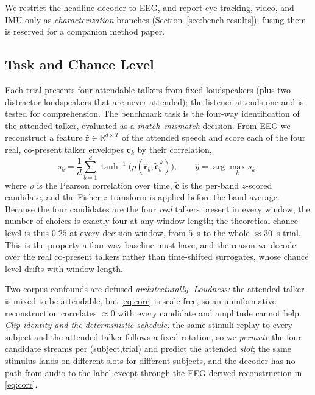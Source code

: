 \documentclass[journal]{IEEEtran}
\newcommand{\chance}{0.25}
\begin{document}
We restrict the headline decoder to EEG, and report eye tracking, video, and IMU
only as \emph{characterization} branches (Section~\ref{sec:bench-results}); fusing
them is reserved for a companion method paper.

\subsection{Task and Chance Level}
\label{sec:bench-task}

Each trial presents four attendable talkers from fixed loudspeakers (plus two
distractor loudspeakers that are never attended); the listener attends one and is
tested for comprehension. The benchmark task is the four-way identification of the
attended talker, evaluated as a \emph{match--mismatch} decision. From EEG we
reconstruct a feature $\hat{\mathbf r}\in\mathbb R^{d\times T}$ of the attended
speech and score each of the four real, co-present talker envelopes $\mathbf c_k$
by their correlation,
\begin{equation}
s_k=\frac{1}{d}\sum_{b=1}^{d}\tanh^{-1}\!\big(\rho(\hat{\mathbf r}_b,\tilde{\mathbf c}^{\,k}_b)\big),
\qquad \hat y=\arg\max_k s_k,
\label{eq:corr}
\end{equation}
where $\rho$ is the Pearson correlation over time, $\tilde{\mathbf c}$ is the
per-band $z$-scored candidate, and the Fisher $z$-transform is applied before the
band average. Because the four candidates are the four \emph{real} talkers present
in every window, the number of choices is exactly four at any window length; the
theoretical chance level is thus $\chance$ at every decision window, from $5$~s to
the whole $\approx\!30$~s trial. This is the property a four-way baseline must have,
and the reason we decode over the real co-present talkers rather than time-shifted
surrogates, whose chance level drifts with window length.

Two corpus confounds are defused \emph{architecturally}. \emph{Loudness:} the
attended talker is mixed to be attendable, but \eqref{eq:corr} is scale-free, so an
uninformative reconstruction correlates $\approx\!0$ with every candidate and
amplitude cannot help. \emph{Clip identity and the deterministic schedule:} the same
stimuli replay to every subject and the attended talker follows a fixed rotation, so
we \emph{permute} the four candidate streams per (subject,trial) and predict the
attended \emph{slot}; the same stimulus lands on different slots for different
subjects, and the decoder has no path from audio to the label except through the
EEG-derived reconstruction in \eqref{eq:corr}.
\end{document}
